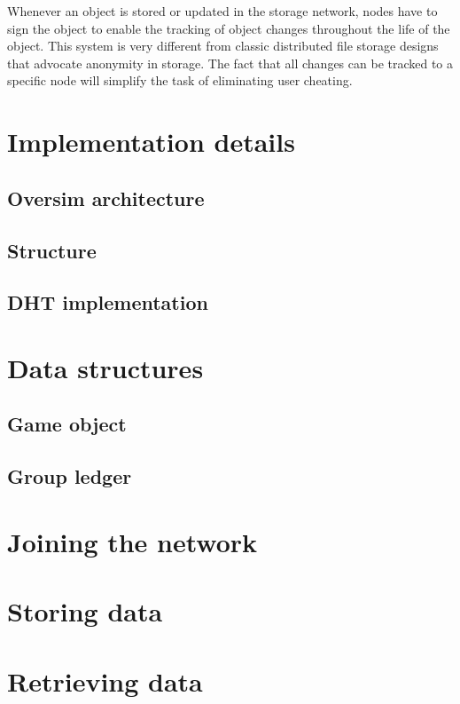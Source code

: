 Whenever an object is stored or updated in the storage network, nodes have to sign the object to enable the tracking of object changes throughout the
life of the object. This system is very different from classic distributed file storage designs that advocate anonymity in storage. The fact that all
changes can be tracked to a specific node will simplify the task of eliminating user cheating.

\section{Implementation details}

\subsection{Oversim architecture}
    \subsection{Structure}

        \subsection{DHT implementation}

    \section{Data structures}

        \subsection{Game object}

        \subsection{Group ledger}

    \section{Joining the network}

    \section{Storing data}

    \section{Retrieving data}

